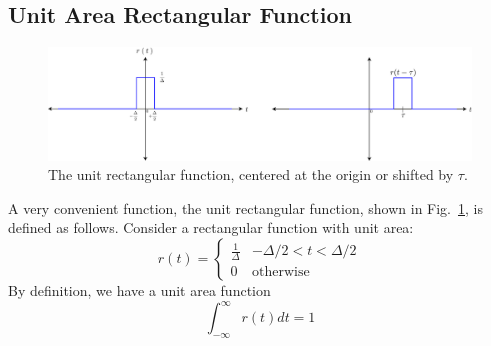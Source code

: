 \subsection{Unit Area Rectangular Function}
\begin{figure}[tb]
\centering
\includegraphics[width=1\columnwidth]{rect_func}
\caption{The unit rectangular function, centered at the origin or shifted by $\tau$. }
\label{fig:fun_rect}
\end{figure}
A very convenient function, the unit rectangular function, shown in Fig.~\ref{fig:fun_rect}, is defined as follows.  Consider a rectangular function with unit area:
    \begin{equation}
        r(t) = \left\{ 
        \begin{array}{cc} 
        \frac{1}{\Delta} & -\Delta/2 < t < \Delta/2 \\ 
        0  & \mathrm{otherwise} 
        \end{array} \right.
    \end{equation}
 By definition, we have a unit area function
    \begin{equation}
        \int_{-\infty}^{\infty} r(t) dt = 1
    \end{equation}
